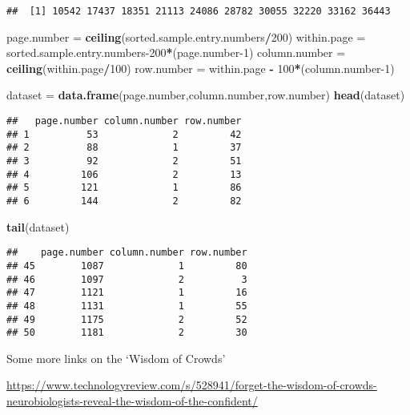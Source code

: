 \documentclass[]{book}
\newenvironment{Shaded}{\begin{snugshade}}{\end{snugshade}}
\newcommand{\DecValTok}[1]{\textcolor[rgb]{0.00,0.00,0.81}{#1}}
\newcommand{\KeywordTok}[1]{\textcolor[rgb]{0.13,0.29,0.53}{\textbf{#1}}}
\newcommand{\NormalTok}[1]{#1}
\newcommand{\OperatorTok}[1]{\textcolor[rgb]{0.81,0.36,0.00}{\textbf{#1}}}
\newcommand{\StringTok}[1]{\textcolor[rgb]{0.31,0.60,0.02}{#1}}
\begin{document}
\begin{verbatim}
##  [1] 10542 17437 18351 21113 24086 28782 30055 32220 33162 36443
\end{verbatim}

\begin{Shaded}
\begin{Highlighting}[]
\NormalTok{page.number =}\StringTok{ }\KeywordTok{ceiling}\NormalTok{(sorted.sample.entry.numbers}\OperatorTok{/}\DecValTok{200}\NormalTok{)}
\NormalTok{within.page =}\StringTok{ }\NormalTok{sorted.sample.entry.numbers}\DecValTok{-200}\OperatorTok{*}\NormalTok{(page.number}\DecValTok{-1}\NormalTok{)}
\NormalTok{column.number =}\StringTok{ }\KeywordTok{ceiling}\NormalTok{(within.page}\OperatorTok{/}\DecValTok{100}\NormalTok{)}
\NormalTok{row.number =}\StringTok{ }\NormalTok{within.page }\OperatorTok{-}\StringTok{ }\DecValTok{100}\OperatorTok{*}\NormalTok{(column.number}\DecValTok{-1}\NormalTok{)}

\NormalTok{dataset =}\StringTok{ }\KeywordTok{data.frame}\NormalTok{(page.number,column.number,row.number)}
\KeywordTok{head}\NormalTok{(dataset)}
\end{Highlighting}
\end{Shaded}

\begin{verbatim}
##   page.number column.number row.number
## 1          53             2         42
## 2          88             1         37
## 3          92             2         51
## 4         106             2         13
## 5         121             1         86
## 6         144             2         82
\end{verbatim}

\begin{Shaded}
\begin{Highlighting}[]
\KeywordTok{tail}\NormalTok{(dataset)}
\end{Highlighting}
\end{Shaded}

\begin{verbatim}
##    page.number column.number row.number
## 45        1087             1         80
## 46        1097             2          3
## 47        1121             1         16
## 48        1131             1         55
## 49        1175             2         52
## 50        1181             2         30
\end{verbatim}

Some more links on the `Wisdom of Crowds'

\url{https://www.technologyreview.com/s/528941/forget-the-wisdom-of-crowds-neurobiologists-reveal-the-wisdom-of-the-confident/}
\end{document}
